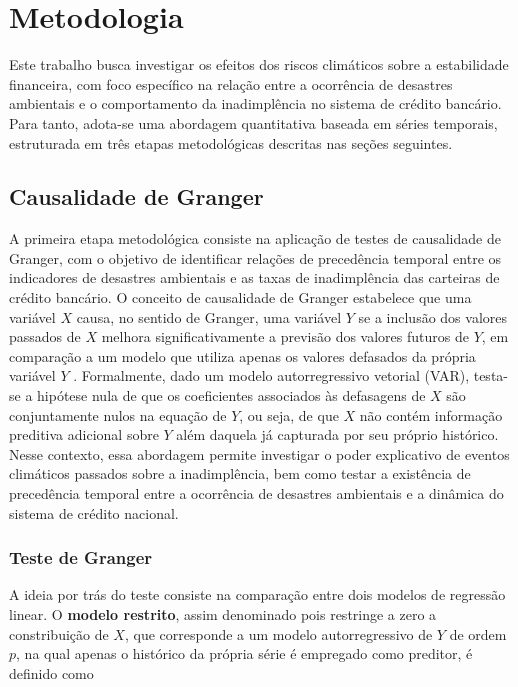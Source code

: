 \chapter{Metodologia}
\label{c2_metodologias_tg}

Este trabalho busca investigar os efeitos dos riscos climáticos sobre a estabilidade financeira, com foco específico na relação entre a ocorrência de desastres ambientais e o comportamento da inadimplência no sistema de crédito bancário. Para tanto, adota-se uma abordagem quantitativa baseada em séries temporais, estruturada em três etapas metodológicas  descritas nas seções seguintes.

\section{Causalidade de Granger}
A primeira etapa metodológica consiste na aplicação de testes de causalidade de Granger, com o objetivo de identificar relações de precedência temporal entre os indicadores de desastres ambientais e as taxas de inadimplência das carteiras de crédito bancário. O conceito de causalidade de Granger estabelece que uma variável $X$ causa, no sentido de Granger, uma variável $Y$ se a inclusão dos valores passados de $X$ melhora significativamente a previsão dos valores futuros de $Y$, em comparação a um modelo que utiliza apenas os valores defasados da própria variável $Y$ \citep{granger1969}. Formalmente, dado um modelo autorregressivo vetorial (VAR), testa-se a hipótese nula de que os coeficientes associados às defasagens de $X$ são conjuntamente nulos na equação de $Y$, ou seja, de que $X$ não contém informação preditiva adicional sobre $Y$ além daquela já capturada por seu próprio histórico.
Nesse contexto, essa abordagem permite investigar o poder explicativo de eventos climáticos passados sobre a inadimplência, bem como testar a existência de precedência temporal entre a ocorrência de desastres ambientais e a dinâmica do sistema de crédito nacional.


\subsection{Teste de Granger}
A ideia por trás do teste consiste na comparação entre dois modelos de regressão linear. O \textbf{modelo restrito}, assim denominado pois restringe a zero a constribuição  de $X$, que corresponde a um modelo autorregressivo de $Y$ de ordem $p$, na qual apenas o histórico da própria série é empregado como preditor, é definido como

